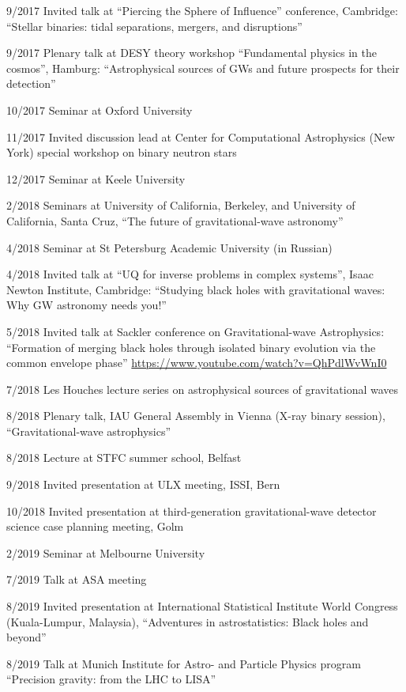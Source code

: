 \documentclass[margin,line]{res}
\begin{document}
\begin{resume}
9/2017	Invited talk at ``Piercing the Sphere of Influence'' conference, Cambridge: ``Stellar binaries: tidal separations, mergers, and disruptions''

9/2017	Plenary talk at DESY theory workshop ``Fundamental physics in the cosmos'', Hamburg: ``Astrophysical sources of GWs and future prospects for their detection''

10/2017	Seminar at Oxford University

11/2017 	Invited discussion lead at Center for Computational Astrophysics (New York) special workshop on binary neutron stars

12/2017 	Seminar at Keele University

2/2018  	Seminars at University of California, Berkeley, and University of California, Santa Cruz, ``The future of gravitational-wave astronomy''

4/2018	Seminar at St Petersburg Academic University (in Russian)

4/2018	Invited talk at ``UQ for inverse problems in complex systems'', Isaac Newton Institute, Cambridge: ``Studying black holes with gravitational waves: Why GW astronomy needs you!''

5/2018 Invited talk at Sackler conference on Gravitational-wave Astrophysics: ``Formation of merging black holes through isolated binary evolution via the common envelope phase'' \url{https://www.youtube.com/watch?v=QhPdlWvWnI0}

7/2018 Les Houches lecture series on astrophysical sources of gravitational waves

8/2018 Plenary talk, IAU General Assembly in Vienna (X-ray binary session), ``Gravitational-wave astrophysics''

8/2018 Lecture at STFC summer school, Belfast

9/2018 Invited presentation at ULX meeting, ISSI, Bern

10/2018 Invited presentation at third-generation gravitational-wave detector science case planning meeting, Golm

2/2019 Seminar at Melbourne University

7/2019 Talk at ASA meeting

8/2019 Invited presentation at International Statistical Institute World Congress (Kuala-Lumpur, Malaysia), ``Adventures in astrostatistics: Black holes and beyond''

8/2019 Talk at Munich Institute for Astro- and Particle Physics program ``Precision gravity: from the LHC to LISA''


\end{resume}
\end{document}
